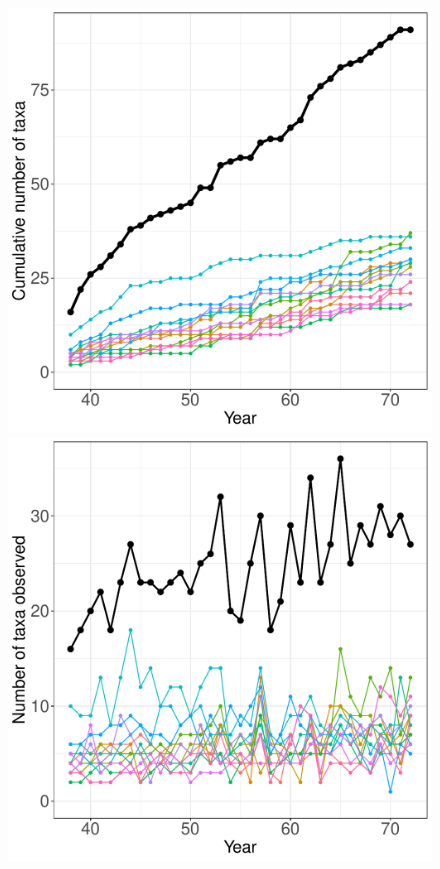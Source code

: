 \documentclass[11pt, oneside]{article}
\begin{document}
\begin{figure}[h!]
\centering
\includegraphics[scale = 0.4]{hays-plants-compagnoni_species_accumulation_curve.pdf}
\includegraphics[scale = 0.4]{hays-plants-compagnoni_num_taxa_over_time.pdf}

\end{figure}
\end{document}
